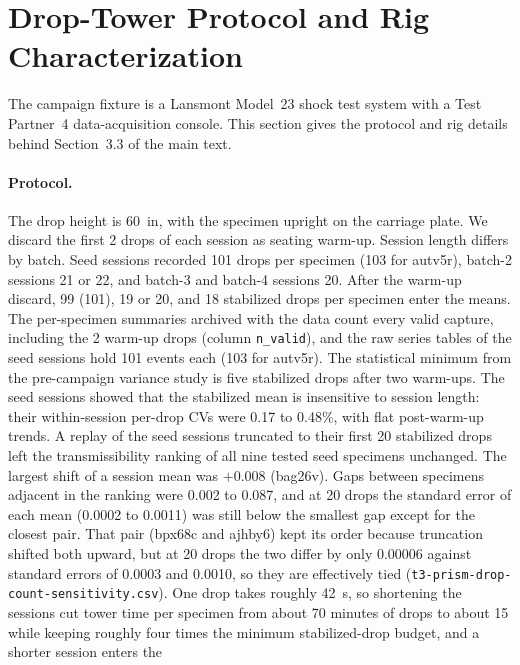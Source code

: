 \documentclass[11pt]{article}
\begin{document}
\section{Drop-Tower Protocol and Rig Characterization}
\label{si:drop}
The campaign fixture is a Lansmont Model~23 shock test system with a Test
Partner~4 data-acquisition console. This section gives the protocol and
rig details behind Section~3.3 of the main text.

\paragraph{Protocol.} The drop height is \SI{60}{in}, with the specimen
upright on the carriage plate. We discard the first 2 drops of each
session as seating warm-up. Session length differs by batch. Seed
sessions recorded 101 drops per specimen (103 for autv5r), batch-2
sessions 21 or 22, and batch-3 and batch-4 sessions 20. After the
warm-up discard, 99 (101), 19 or 20, and 18 stabilized drops per
specimen enter the means. The per-specimen summaries archived with the
data count every valid capture, including the 2 warm-up drops (column
\texttt{n\_valid}), and the raw series tables of the seed sessions hold
101 events each (103 for autv5r).
The statistical minimum from the pre-campaign variance study is five
stabilized drops after two warm-ups. The seed sessions showed that the
stabilized mean is insensitive to session length: their within-session
per-drop CVs were 0.17 to 0.48\%, with flat post-warm-up trends. A
replay of the seed sessions truncated to their first 20 stabilized
drops left the transmissibility ranking of all nine tested seed
specimens unchanged. The largest shift of a session mean was $+0.008$
(bag26v). Gaps between specimens adjacent in the ranking were 0.002 to
0.087, and at 20 drops the standard error of each mean (0.0002 to
0.0011) was still below the smallest gap except for the closest pair.
That pair (bpx68c and ajhby6) kept its order because truncation shifted
both upward, but at 20 drops the two differ by only 0.00006 against
standard errors of 0.0003 and 0.0010, so they are effectively tied
(\texttt{t3-prism-drop-count-sensitivity.csv}). One drop takes roughly
\SI{42}{s}, so shortening the sessions cut tower time per specimen from
about 70 minutes of drops to about 15 while keeping roughly four times
the minimum stabilized-drop budget, and a shorter session enters the
\end{document}
